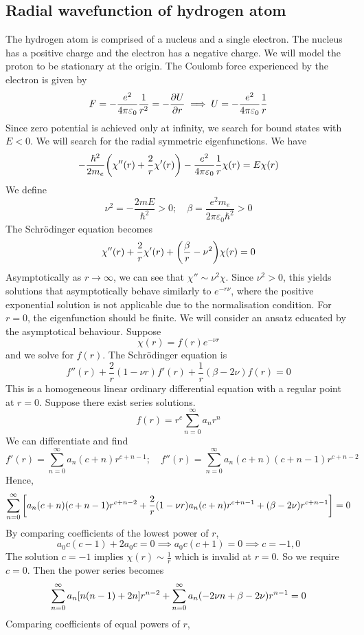 \subsection{Radial wavefunction of hydrogen atom}
The hydrogen atom is comprised of a nucleus and a single electron.
The nucleus has a positive charge and the electron has a negative charge.
We will model the proton to be stationary at the origin.
The Coulomb force experienced by the electron is given by
\[
	F = -\frac{e^2}{4\pi \varepsilon_0} \frac{1}{r^2} = -\pdv{U}{r} \implies U = -\frac{e^2}{4\pi \varepsilon_0} \frac{1}{r}
\]
Since zero potential is achieved only at infinity, we search for bound states with \( E < 0 \).
We will search for the radial symmetric eigenfunctions.
We have
\[
	-\frac{\hbar^2}{2m_e} \qty( \chi''(r) + \frac{2}{r} \chi'(r) ) - \frac{e^2}{4 \pi \varepsilon_0} \frac{1}{r} \chi(r) = E \chi(r)
\]
We define
\[
	\nu^2 = -\frac{2mE}{\hbar^2} > 0;\quad \beta = \frac{e^2 m_e}{2\pi \varepsilon_0 \hbar^2} > 0
\]
The Schr\"odinger equation becomes
\[
	\chi''(r) + \frac{2}{r} \chi'(r) + \qty( \frac{\beta}{r} - \nu^2 ) \chi(r) = 0
\]
Asymptotically as \( r \to \infty \), we can see that \( \chi'' \sim \nu^2 \chi \).
Since \( \nu^2 > 0 \), this yields solutions that asymptotically behave similarly to \( e^{-r \nu} \), where the positive exponential solution is not applicable due to the normalisation condition.
For \( r = 0 \), the eigenfunction should be finite.
We will consider an ansatz educated by the asymptotical behaviour.
Suppose
\[
	\chi(r) = f(r) e^{-\nu r}
\]
and we solve for \( f(r) \).
The Schr\"odinger equation is
\[
	f''(r) + \frac{2}{r} (1 - \nu r) f'(r) + \frac{1}{r} (\beta - 2 \nu) f(r) = 0
\]
This is a homogeneous linear ordinary differential equation with a regular point at \( r = 0 \).
Suppose there exist series solutions.
\[
	f(r) = r^c \sum_{n=0}^\infty a_n r^n
\]
We can differentiate and find
\[
	f'(r) = \sum_{n=0}^\infty a_n (c+n) r^{c+n-1};\quad f''(r) = \sum_{n=0}^\infty a_n (c+n)(c+n-1) r^{c+n-2}
\]
Hence,
\[
	\sum_{n=0}^\infty \qty[ a_n (c+n)(c+n-1) r^{c+n-2} + \frac{2}{r}(1-\nu r) a_n (c+n) r^{c+n-1} + (\beta - 2\nu)r^{c+n-1} ] = 0
\]
By comparing coefficients of the lowest power of \( r \),
\[
	a_0 c(c-1) + 2a_0 c = 0 \implies a_0 c (c+1) = 0 \implies c = -1, 0
\]
The solution \( c = -1 \) implies \( \chi(r) \sim \frac{1}{r} \) which is invalid at \( r = 0 \).
So we require \( c = 0 \).
Then the power series becomes
\[
	\sum_{n=0}^\infty a_n \qty[n(n-1) + 2n] r^{n-2} + \sum_{n=0}^\infty a_n \qty( -2\nu n + \beta - 2 \nu ) r^{n-1} = 0
\]
Comparing coefficients of equal powers of \( r \),

